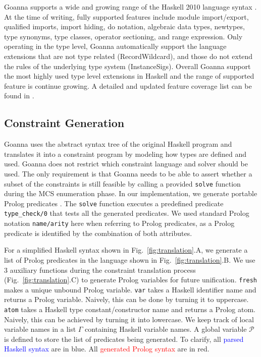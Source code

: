 \documentclass[pdflatex,sn-mathphys-num]{sn-jnl}%
\begin{document}
    Goanna supports a wide and growing range of the Haskell 2010 language syntax \cite{Simon_Marlow2010-lg}. At the time of writing, fully supported features include module import/export, qualified imports, import hiding, do notation, algebraic data types, newtypes, type synonyms, type classes, operator sectioning, and range expression. Only operating in the type level, Goanna automatically support the language extensions that are not type related (RecordWildcard), and those do not extend the rules of the underlying type system (InstanceSigs). Overall Goanna support the most highly used type level extensions in Haskell and the range of supported feature is continue growing.  A detailed and updated feature coverage list can be found in \cite{Fu2023-rp}.

    \subsection{Constraint Generation} \label{sub:translation}
    Goanna uses the abstract syntax tree of the original Haskell program and translates it into a constraint program by modeling how types are defined and used. Goanna does not restrict which constraint language and solver should be used. The only requirement is that Goanna needs to be able to assert whether a subset of the constraints is still feasible by calling a provided \texttt{solve} function during the MCS enumeration phase. In our implementation, we generate portable Prolog predicates \cite{Wielemaker2011-sr}. The \texttt{solve} function executes a predefined predicate \texttt{type\_check/0} that tests all the generated predicates. We used standard Prolog notation \texttt{name/arity} here when referring to Prolog predicates, as a Prolog predicate is identified by the combination of both attributes. 

    
    For a simplified Haskell syntax shown in Fig.~\ref{fig:translation}.A, we generate a list of Prolog predicates in the language shown in Fig.~\ref{fig:translation}.B. We use 3 auxiliary functions during the constraint translation process (Fig.~\ref{fig:translation}.C) to generate Prolog variables for future unification. \texttt{fresh} makes a unique unbound Prolog variable. \texttt{var} takes a Haskell identifier name and returns a Prolog variable. Naively, this can be done by turning it to uppercase. \texttt{atom} takes a Haskell type constant/constructor name and returns a Prolog atom. Naively, this can be achieved by turning it into lowercase. We keep track of local variable names in a list $\Gamma$ containing Haskell variable names. A global variable $\mathcal{P}$ is defined to store the list of predicates being generated. To clarify, all \textcolor{blue}{parsed Haskell syntax} are in blue. All \textcolor{red}{generated Prolog syntax} are in red. 
    
\end{document}
